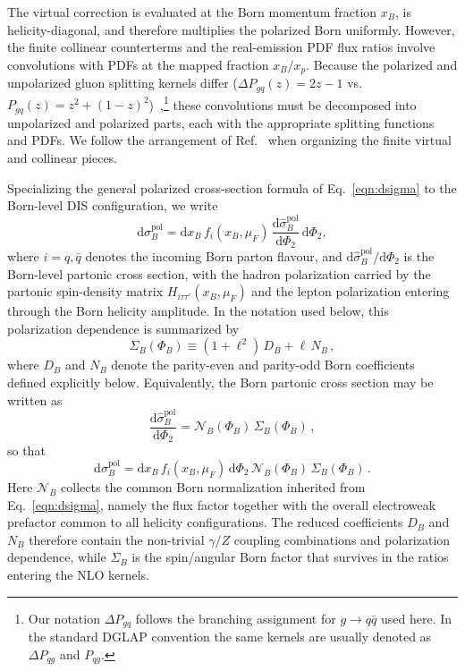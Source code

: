 \documentclass[a4paper,11pt]{article}
\begin{document}
The virtual correction is evaluated at the Born momentum fraction $x_B$, is helicity-diagonal, and therefore multiplies the polarized Born uniformly.
However, the finite collinear counterterms and the real-emission PDF flux ratios involve convolutions with PDFs at the mapped fraction $x_B/x_p$.  Because the polarized and unpolarized gluon splitting kernels differ ($\Delta P_{gq}(z) = 2z-1$ vs.\ $P_{gq}(z) = z^2+(1{-}z)^2$)~\cite{Altarelli:1977zs,Mertig:1995ny},\footnote{Our notation $\Delta P_{gq}$ follows the branching assignment for $g\to q\bar q$ used here. In the standard DGLAP convention the same kernels are usually denoted as $\Delta P_{qg}$ and $P_{qg}$.} these convolutions must be decomposed into unpolarized and polarized parts, each with the appropriate splitting functions and PDFs.
We follow the arrangement of Ref.~\cite{DErrico:2011wfa} when organizing the finite virtual and collinear pieces.

Specializing the general polarized cross-section formula of Eq.~\eqref{eqn:dsigma} to the Born-level DIS configuration, we write
\begin{equation}
  \mathrm{d}\sigma_B^{\text{pol}}
  =
  \mathrm{d}x_B\, f_i(x_B,\mu_F)\,
  \frac{\mathrm{d}\hat\sigma_B^{\text{pol}}}{\mathrm{d}\Phi_2}\,
  \mathrm{d}\Phi_2 ,
\end{equation}
where $i=q,\bar q$ denotes the incoming Born parton flavour, and $\mathrm{d}\hat\sigma_B^{\text{pol}}/\mathrm{d}\Phi_2$ is the Born-level partonic cross section, with the hadron polarization carried by the partonic spin-density matrix $H_{i\tau\tau'}(x_B,\mu_F)$ and the lepton polarization entering through the Born helicity amplitude. In the notation used below, this polarization dependence is summarized by
\begin{equation}
  \Sigma_B(\Phi_B)\equiv (1+\ell^2)\,D_B+\ell\,N_B\,,
\label{eq:born-decomp}
\end{equation}
where $D_B$ and $N_B$ denote the parity-even and parity-odd Born coefficients defined explicitly below. Equivalently, the Born partonic cross section may be written as
\begin{equation}
  \frac{\mathrm{d}\hat\sigma_B^{\text{pol}}}{\mathrm{d}\Phi_2}
  =
  \mathcal{N}_B(\Phi_B)\,\Sigma_B(\Phi_B)\,,
\end{equation}
so that
\begin{equation}
  \mathrm{d}\sigma_B^{\text{pol}}
  =
  \mathrm{d}x_B\, f_i(x_B,\mu_F)\,\mathrm{d}\Phi_2\,
  \mathcal{N}_B(\Phi_B)\,\Sigma_B(\Phi_B)\,.
\end{equation}
Here $\mathcal{N}_B$ collects the common Born normalization inherited from Eq.~\eqref{eqn:dsigma}, namely the flux factor together with the overall electroweak prefactor common to all helicity configurations. The reduced coefficients $D_B$ and $N_B$ therefore contain the non-trivial $\gamma/Z$ coupling combinations and polarization dependence, while $\Sigma_B$ is the spin/angular Born factor that survives in the ratios entering the NLO kernels.
\end{document}
